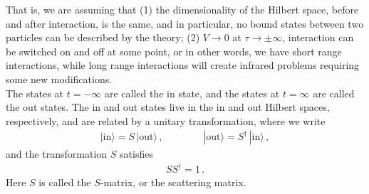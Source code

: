 \documentclass[11pt, onesided]{book}
\theoremstyle{break}
\theoremstyle{break}
\begin{document}
That is, we are assuming that (1) the dimensionality of the Hilbert space, before and after interaction, is the same, and in particular, no bound states between two particles can be described by the theory; (2) $V\to 0$ at $\tau \to \pm \infty$, interaction can be switched on and off at some point, or in other words, we have short range interactions, while long range interactions will create infrared problems requiring some new modifications. \\

The states at $t = -\infty$ are called the in state, and the states at $t = \infty$ are called the out states. The in and out states live in the in and out Hilbert spaces, respectively, and are related by a unitary transformation, where we write
\begin{align*}
|\text{in}\rangle = S\,|\text{out}\rangle\,,\qquad\qquad |\text{out}\rangle = S^\dagger\,|\text{in}\rangle\,,
\end{align*}
and the transformation $S$ satisfies
\begin{align*}
SS^\dagger = 1\,.
\end{align*}
Here $S$ is called the $S$-matrix, or the scattering matrix. \\
\end{document}
